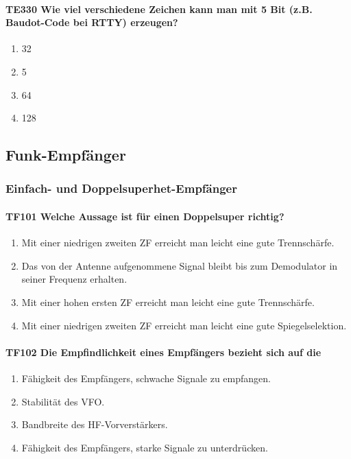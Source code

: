 \documentclass[8pt]{article}
\begin{document}
\begin{enumerate}
\paragraph*{TE330 Wie viel verschiedene Zeichen kann man mit 5 Bit (z.B. Baudot-Code bei RTTY) erzeugen?}
\begin{enumerate}[nolistsep,label=\Alph*]
\item 32
\item 5
\item 64
\item 128
\end{enumerate}

\pagebreak
\subsection{Funk-Empfänger}
\subsubsection{Einfach- und Doppelsuperhet-Empfänger}
\paragraph*{TF101 Welche Aussage ist für einen Doppelsuper richtig?}
\begin{enumerate}[nolistsep,label=\Alph*]
\item Mit einer niedrigen zweiten ZF erreicht man leicht eine gute Trennschärfe.
\item Das von der Antenne aufgenommene Signal bleibt bis zum Demodulator in seiner Frequenz erhalten.
\item Mit einer hohen ersten ZF erreicht man leicht eine gute Trennschärfe.
\item Mit einer niedrigen zweiten ZF erreicht man leicht eine gute Spiegelselektion.
\end{enumerate}

\paragraph*{TF102 Die Empfindlichkeit eines Empfängers bezieht sich auf die}
\begin{enumerate}[nolistsep,label=\Alph*]
\item Fähigkeit des Empfängers, schwache Signale zu empfangen.
\item Stabilität des VFO.
\item Bandbreite des HF-Vorverstärkers.
\item Fähigkeit des Empfängers, starke Signale zu unterdrücken.
\end{enumerate}


\end{enumerate}
\end{document}
